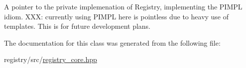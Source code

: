 A pointer to the private implemenation of Registry, implementing the P\+I\+M\+PL idiom. X\+XX\+: currently using P\+I\+M\+PL here is pointless due to heavy use of templates. This is for future development plans. 



The documentation for this class was generated from the following file\+:\begin{DoxyCompactItemize}
\item 
registry/src/\hyperlink{registry__core_8hpp}{registry\+\_\+core.\+hpp}\end{DoxyCompactItemize}
